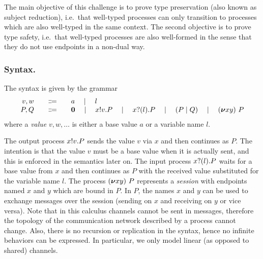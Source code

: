 \documentclass[runningheads]{llncs}
\begin{document}
The main objective of this challenge is to prove type preservation (also
known as subject reduction), i.e.\ that well-typed
processes can only transition to processes which are also well-typed
in the same context.
The second objective is to prove type safety, i.e.\ that well-typed processes are also well-formed in the sense that they do not use endpoints in a non-dual way.

\subsubsection{Syntax.}
The syntax is given by the grammar
\[
\begin{array}{r@{\qquad}c@{\qquad}l}
  v,w & \Coloneqq & a \quad\mid\quad l \\
   P,Q & \Coloneqq & \Pend \quad\mid\quad \Pout{x}{v}{P} \quad\mid\quad \Pin{x}{l}{P} \quad\mid\quad \PBpar{P}{Q} \quad\mid\quad  \Presd{x}{y}{P}
\end{array}
\]
where a \emph{value} \( v, w, \dots \) is either a base value \( a \) or a variable name \( l \).

The output process \( x ! v . P \) sends the value \( v \) via \( x \) and then continues as \( P \).
The intention is that the value \( v \) must be a base value when it is actually sent, and this is enforced in the semantics later on.
The input process \( x ? (l) . P \) waits for a base value from \( x \) and then continues as \( P \) with the received value substituted for the variable name \( l \).
%
The process \( (\bm{\nu} xy)~P \) represents a \emph{session} with endpoints named \( x \) and \( y \) which are bound in \( P \). In \( P \), the names \( x \) and \( y \) can be used to exchange messages over the session (sending on \( x \) and receiving on \( y \) or vice versa).
%
%
Note that in this calculus channels cannot be sent in messages, therefore the topology of the communication network described by a process cannot change.
Also, there is no recursion or replication in the syntax, hence no infinite behaviors can be expressed. In particular, we only model linear (as opposed to shared) channels.
\end{document}
